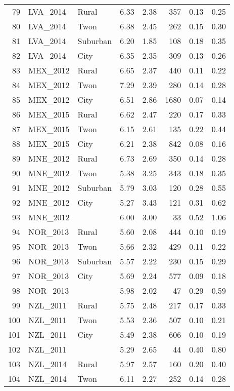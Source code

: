 \documentclass[12pt, titlepage]{article}
\begin{document}
\begin{longtable}[H]{rllrrrrr}
		79 & LVA\_2014 & Rural & 6.33 & 2.38 & 357 & 0.13 & 0.25 \\ 
		80 & LVA\_2014 & Twon & 6.38 & 2.45 & 262 & 0.15 & 0.30 \\ 
		81 & LVA\_2014 & Suburban & 6.20 & 1.85 & 108 & 0.18 & 0.35 \\ 
		82 & LVA\_2014 & City & 6.35 & 2.35 & 309 & 0.13 & 0.26 \\ 
		83 & MEX\_2012 & Rural & 6.65 & 2.37 & 440 & 0.11 & 0.22 \\ 
		84 & MEX\_2012 & Twon & 7.29 & 2.39 & 280 & 0.14 & 0.28 \\ 
		85 & MEX\_2012 & City & 6.51 & 2.86 & 1680 & 0.07 & 0.14 \\ 
		86 & MEX\_2015 & Rural & 6.62 & 2.47 & 220 & 0.17 & 0.33 \\ 
		87 & MEX\_2015 & Twon & 6.15 & 2.61 & 135 & 0.22 & 0.44 \\ 
		88 & MEX\_2015 & City & 6.21 & 2.38 & 842 & 0.08 & 0.16 \\ 
		89 & MNE\_2012 & Rural & 6.73 & 2.69 & 350 & 0.14 & 0.28 \\ 
		90 & MNE\_2012 & Twon & 5.38 & 3.25 & 343 & 0.18 & 0.35 \\ 
		91 & MNE\_2012 & Suburban & 5.79 & 3.03 & 120 & 0.28 & 0.55 \\ 
		92 & MNE\_2012 & City & 5.27 & 3.43 & 121 & 0.31 & 0.62 \\ 
		93 & MNE\_2012 &  & 6.00 & 3.00 &  33 & 0.52 & 1.06 \\ 
		94 & NOR\_2013 & Rural & 5.60 & 2.08 & 444 & 0.10 & 0.19 \\ 
		95 & NOR\_2013 & Twon & 5.66 & 2.32 & 429 & 0.11 & 0.22 \\ 
		96 & NOR\_2013 & Suburban & 5.57 & 2.22 & 230 & 0.15 & 0.29 \\ 
		97 & NOR\_2013 & City & 5.69 & 2.24 & 577 & 0.09 & 0.18 \\ 
		98 & NOR\_2013 &  & 5.98 & 2.02 &  47 & 0.29 & 0.59 \\ 
		99 & NZL\_2011 & Rural & 5.75 & 2.48 & 217 & 0.17 & 0.33 \\ 
		100 & NZL\_2011 & Twon & 5.53 & 2.36 & 507 & 0.10 & 0.21 \\ 
		101 & NZL\_2011 & City & 5.49 & 2.38 & 606 & 0.10 & 0.19 \\ 
		102 & NZL\_2011 &  & 5.29 & 2.65 &  44 & 0.40 & 0.80 \\ 
		103 & NZL\_2014 & Rural & 5.97 & 2.57 & 160 & 0.20 & 0.40 \\ 
		104 & NZL\_2014 & Twon & 6.11 & 2.27 & 252 & 0.14 & 0.28 \\ 

\end{longtable}
\end{document}

